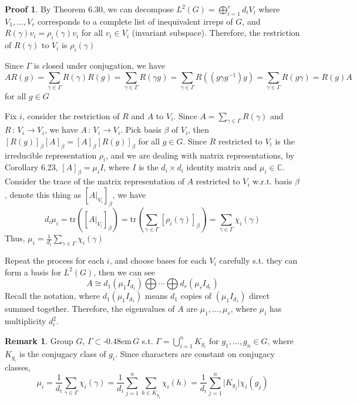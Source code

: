 \documentclass{book}
\newcommand{\C}{\mathbb{C}}
\newcommand{\syin}{$\subset$\kern-0.48em\raisebox{.20ex}{\tiny S}$\,$}
\newcommand{\abs}[1]{\lvert #1 \rvert }
\newcommand{\tr}[1]{\textrm{tr}( #1 )}
\theoremstyle{definition}
\theoremstyle{remarkstyle}
\newtheorem*{remark}{Remark}%
\newtheorem*{myproof}{Proof}%
\begin{document}
\begin{myproof}
    By Theorem 6.30, we can decompose $L^2(G) = \bigoplus^r_{i=1}d_iV_i $ where $V_1,\dots,V_r$ corresponds to a complete list of inequivalent irreps of $G$, and $R(\gamma)v_i=\rho_i(\gamma)v_i$ for all $v_i\in V_i$ (invariant subspace). Therefore, the restriction of $R(\gamma)$ to $V_i$ is $\rho_i(\gamma)$ \newline 

    Since $\Gamma$ is closed under conjugation, we have 
    $$
    AR(g) = \sum_{\gamma\in\Gamma}R(\gamma)R(g) = \sum_{\gamma\in\Gamma}R(\gamma g) = \sum_{\gamma\in\Gamma}R((g\gamma g^{-1})g) = \sum_{\gamma\in\Gamma}R(g\gamma) = R(g)A
    $$
    for all $g\in G$ \newline 

    Fix $i$, consider the restriction of $R$ and $A$ to $V_i$. Since $A=\sum_{\gamma\in\Gamma}R(\gamma) $ and $R\,:\,V_i\rightarrow V_i$, we have $A\,:\,V_i\rightarrow V_i$. Pick basis $\beta$ of $V_i$, then $[R(g)]_\beta[A]_\beta = [A]_\beta[R(g)]_\beta $ for all $g\in G$. Since $R$ restricted to $V_i$ is the irreducible representation $\rho_i$, and we are dealing with matrix representations, by Corollary 6.23, $[A]_\beta = \mu_iI$, where $I$ is the $d_i\times d_i $ identity matrix and $\mu_i\in \C$. Consider the trace of the matrix representation of $A$ restricted to $V_i$ w.r.t. basis $\beta$, denote this thing as $[A\lvert_{V_i}]_\beta $, we have
    $$
    d_i\mu_i = \tr{[A\lvert_{V_i}]_\beta} = \tr{\sum_{\gamma\in\Gamma}[\rho_i(\gamma)]_\beta} = \sum_{\gamma\in\Gamma}\chi_i(\gamma)
    $$
    Thus, $\mu_i=\frac{1}{d_i}\sum_{\gamma\in\Gamma}\chi_i(\gamma) $ \newline 

    Repeat the process for each $i$, and choose bases for each $V_i$ carefully s.t. they can form a basis for $L^2(G)$, then we can see 
    $$
    A \cong d_1(\mu_1I_{d_1}) \bigoplus\cdots \bigoplus d_r(\mu_rI_{d_r})
    $$
    Recall the notation, where $d_1(\mu_1I_{d_1})$ means $d_1$ copies of $(\mu_1I_{d_1})$ direct summed together. Therefore, the eigenvalues of $A$ are $\mu_1,\dots,\mu_r$, where $\mu_i$ has multiplicity $d^2_i$. \newline 
\end{myproof}

\begin{remark}
    Group $G$, $\Gamma$\syin$G$ s.t. $\Gamma=\bigcup^n_{i=1}K_{g_i} $ for $g_1,\dots,g_n\in G$, where $K_{g_i} $ is the conjugacy class of $g_i$. Since characters are constant on conjugacy classes,
    $$
    \mu_i = \frac{1}{d_i}\sum_{\gamma\in\Gamma}\chi_i(\gamma) = \frac{1}{d_i}\sum_{j=1}^n\sum_{h\in K_{g_j}}\chi_i(h) = \frac{1}{d_i}\sum_{j=1}^n\abs{K_{g_j}}\chi_i(g_j)
    $$
    \newline 
\end{remark}
\end{document}
